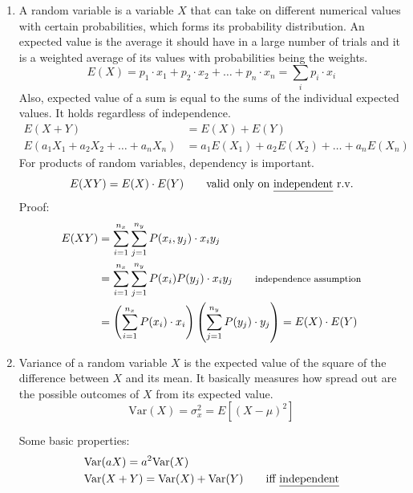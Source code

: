\documentclass[12pt]{article}
\begin{document}
\begin{enumerate}
\item 
A random variable is a variable $X$ that can take on different numerical values with certain probabilities, which forms its probability distribution. 
An expected value is the average it should have in a large number of trials and it is a weighted average of its values with probabilities being the weights. 
$$
E(X) = p_1 \cdot x_1 + p_2 \cdot x_2 + \ldots + p_n \cdot x_n = \sum_i p_i \cdot x_i
$$
Also, expected value of a sum is equal to the sums of the individual expected values. It holds regardless of independence. 
\begin{align*}
E(X + Y) & = E(X) + E(Y) \\
E(a_1 X_1 + a_2 X_2 + \ldots + a_n X_n) & = a_1 E(X_1) + a_2 E(X_2) + \ldots + a_n E(X_n)
\end{align*}
For products of random variables, dependency is important. 
$$ 
E(XY) = E(X) \cdot E(Y)  \qquad \text{valid only on \underline{independent} r.v.}
$$
Proof: 
\begin{align*} 
E(XY) & = \sum_{i = 1}^{n_x} \sum_{j = 1}^{n_y} P(x_i, y_j) \cdot x_i y_j \\
& = \sum_{i = 1}^{n_x} \sum_{j = 1}^{n_y} P(x_i) P(y_j) \cdot x_i y_j \qquad \text{\footnotesize{independence assumption}}   \\
& = \left( \sum_{i = 1}^{n_x} P(x_i) \cdot x_i \right) \left( \sum_{j = 1}^{n_y} P(y_j) \cdot y_j \right) 
= E(X) \cdot E(Y)
\end{align*}


\item 
Variance of a random variable $X$ is the expected value of the square of the difference between $X$ and its mean. 
It basically measures how spread out are the possible outcomes of $X$ from its expected value. 
$$
\text{Var}(X) = \sigma_x^2 = E[ (X - \mu)^2 ]
$$

Some basic properties: 
\begin{align*} 
& \text{Var}(a X) = a^2 \text{Var}(X)  \\
& \text{Var}(X + Y) = \text{Var}(X) + \text{Var}(Y) \qquad \text{iff \underline{independent}} 
\end{align*}


\end{enumerate}
\end{document}
